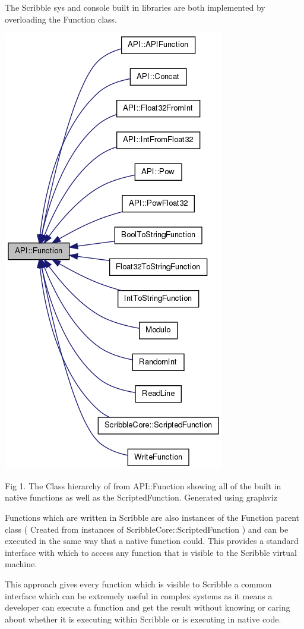 \documentclass[]{final_report}
\begin{document}
The Scribble sys and console built in libraries are both implemented by overloading the Function class.

\includegraphics[scale=0.4]{"function_class_diagram"}

Fig 1. The Class hierarchy of from API::Function showing all of the built in native functions as well as the ScriptedFunction. Generated using graphviz

Functions which are written in Scribble are also instances of the Function parent class ( Created from instances of ScribbleCore::ScriptedFunction ) and can be executed in the same way that a native function could. This provides a standard interface with which to access any function that is visible to the Scribble virtual machine.

This approach gives every function which is visible to Scribble a common interface which can be extremely useful in complex systems as it means a developer can execute a function and get the result without knowing or caring about whether it is executing within Scribble or is executing in native code.
\end{document}
